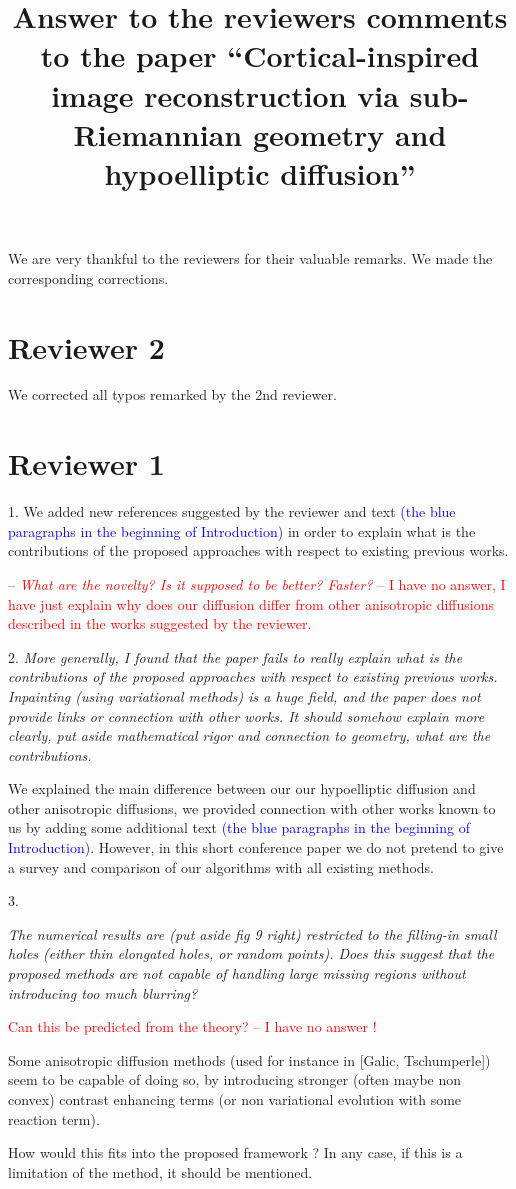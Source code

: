 \documentclass{amsart}
\title[Answer to the reviewers  comments]{Answer to the reviewers comments to the paper ``Cortical-inspired image reconstruction via sub-Riemannian geometry and hypoelliptic diffusion''}
\begin{document}
\maketitle

We are very thankful to the reviewers for their valuable remarks. 
We made the corresponding corrections. 

\section*{Reviewer 2}

We corrected all typos remarked by the 2nd reviewer. 


\section*{Reviewer 1}

1. We added new references suggested by the reviewer and text 
\textcolor{blue}{(the blue paragraphs in the beginning of Introduction)} 
in order to explain what is the contributions of the proposed approaches 
with respect to existing previous works.

-- \textcolor{red}{
{\it What are the novelty? Is it supposed to be better? Faster?
} -- I have no answer, 
I have just explain why does our diffusion differ from other anisotropic diffusions described in the works 
suggested by the reviewer.
}

\medskip 

2. 
{\it More generally, I found that the paper fails to really explain what is the contributions of
the proposed approaches with respect to existing previous works. Inpainting (using
variational methods) is a huge field, and the paper does not provide links or connection
with other works. It should somehow explain more clearly, put aside mathematical rigor
and connection to geometry, what are the contributions.}

We explained the main difference between our our hypoelliptic diffusion and other anisotropic diffusions, 
we provided connection with other works known to us by adding some additional text 
\textcolor{blue}{(the blue paragraphs in the beginning of Introduction)}. 
However, in this short conference paper we do not pretend to give a survey and comparison of our algorithms with all existing methods.

\medskip 

3. 
{\it 
The numerical results are (put aside fig 9 right) restricted to the filling-in small holes
(either thin elongated holes, or random points). Does this suggest that the proposed
methods are not capable of handling large missing regions without introducing too much
blurring? 

\textcolor{red}{
Can this be predicted from the theory? -- {\rm I have no answer !} 
}

Some anisotropic diffusion methods (used for instance in [Galic, Tschumperle]) 
seem to be capable of doing so, by introducing stronger (often maybe non convex) contrast 
enhancing terms (or non variational evolution with some reaction term). 

How would this fits into the proposed framework ? In any case,
if this is a limitation of the method, it should be mentioned.
}
\end{document}
